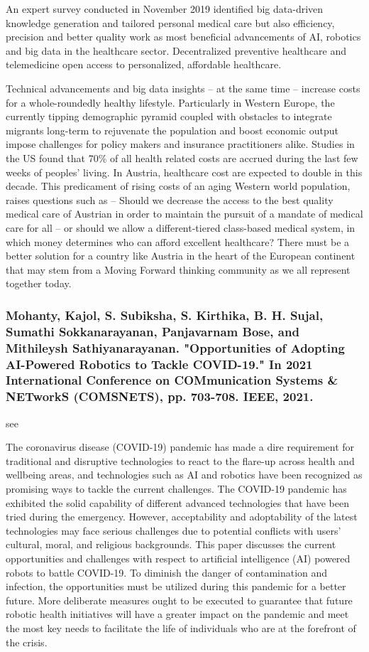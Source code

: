 \documentclass[conference]{IEEEtran}
\begin{document}
An expert survey conducted in November 2019 identified big data-driven knowledge generation and tailored personal medical care but also efficiency, precision and better quality work as most beneficial advancements of AI, robotics and big data in the healthcare sector. Decentralized preventive healthcare and telemedicine open access to personalized, affordable healthcare.

Technical advancements and big data insights – at the same time – increase costs for a whole-roundedly healthy lifestyle. Particularly in Western Europe, the currently tipping demographic pyramid coupled with obstacles to integrate migrants long-term to rejuvenate the population and boost economic output impose challenges for policy makers and insurance practitioners alike. Studies in the US found that 70\% of all health related costs are accrued during the last few weeks of peoples’ living. In Austria, healthcare cost are expected to double in this decade. This predicament of rising costs of an aging Western world population, raises questions such as – Should we decrease the access to the best quality medical care of Austrian in order to maintain the pursuit of a mandate of medical care for all – or should we allow a different-tiered class-based medical system, in which money determines who can afford excellent healthcare? There must be a better solution for a country like Austria in the heart of the European continent that may stem from a Moving Forward thinking community as we all represent together today.

\medskip
\subsubsection{Mohanty, Kajol, S. Subiksha, S. Kirthika, B. H. Sujal, Sumathi Sokkanarayanan, Panjavarnam Bose, and Mithileysh Sathiyanarayanan. "Opportunities of Adopting AI-Powered Robotics to Tackle COVID-19." In 2021 International Conference on COMmunication Systems \& NETworkS (COMSNETS), pp. 703-708. IEEE, 2021.}
see \cite{mohanty2021opportunities}

The coronavirus disease (COVID-19) pandemic has made a dire requirement for traditional and disruptive technologies to react to the flare-up across health and wellbeing areas, and technologies such as AI and robotics have been recognized as promising ways to tackle the current challenges. The COVID-19 pandemic has exhibited the solid capability of different advanced technologies that have been tried during the emergency. However, acceptability and adoptability of the latest technologies may face serious challenges due to potential conflicts with users' cultural, moral, and religious backgrounds. This paper discusses the current opportunities and challenges with respect to artificial intelligence (AI) powered robots to battle COVID-19. To diminish the danger of contamination and infection, the opportunities must be utilized during this pandemic for a better future. More deliberate measures ought to be executed to guarantee that future robotic health initiatives will have a greater impact on the pandemic and meet the most key needs to facilitate the life of individuals who are at the forefront of the crisis.
\end{document}
